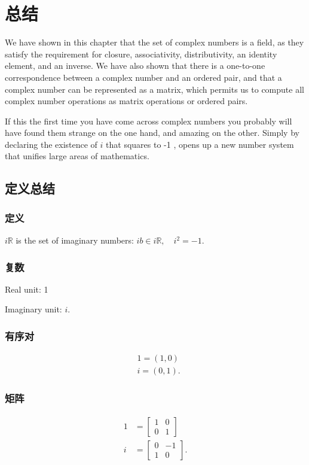 \section{总结}
We have shown in this chapter that the set of complex numbers is a field, as they satisfy the requirement for closure, associativity, distributivity, an identity element, and an inverse. We have also shown that there is a one-to-one correspondence between a complex number and an ordered pair, and that a complex number can be represented as a matrix, which permits us to compute all complex number operations as matrix operations or ordered pairs.

If this the first time you have come across complex numbers you probably will have found them strange on the one hand, and amazing on the other. Simply by declaring the existence of $i$ that squares to -1 , opens up a new number system that unifies large areas of mathematics.

\subsection{定义总结}
\subsubsection{定义}
$i \mathbb{R}$ is the set of imaginary numbers: $i b \in i \mathbb{R}, \quad i^{2}=-1$.

\subsubsection*{复数}

Real unit: 1

Imaginary unit: $i$.

\subsubsection*{有序对}

$$
\begin{aligned}
& 1=(1,0) \\
& i=(0,1) .
\end{aligned}
$$

\subsubsection*{矩阵}

$$
\begin{aligned}
1 & =\left[\begin{array}{ll}
1 & 0 \\
0 & 1
\end{array}\right] \\
i & =\left[\begin{array}{cc}
0 & -1 \\
1 & 0
\end{array}\right] .
\end{aligned}
$$

